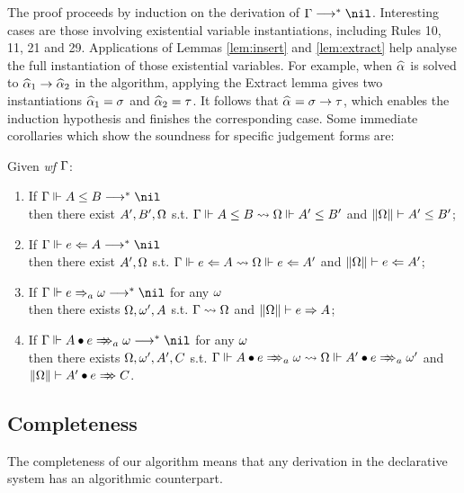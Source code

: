 The proof proceeds by induction on the derivation of $\Gm\redto\nil$.
Interesting cases are those involving existential variable instantiations,
including Rules 10, 11, 21 and 29.
Applications of Lemmas \ref{lem:insert} and \ref{lem:extract}
help analyse the full instantiation of those existential variables.
For example, when $\al$ is solved to $\al[1] \to \al[2]$ in the algorithm,
applying the Extract lemma gives two instantiations $\al[1] = \sigma$ and $\al[2] = \tau$.
It follows that $\al = \sigma \to \tau$, which enables the induction hypothesis
and finishes the corresponding case. Some immediate corollaries which
show the soundness for specific judgement forms are: 


\begin{corollary}
Given \emph{wf }$\Gamma$:
\begin{enumerate}
    \item If $\Gm \Vdash A \le B \redto \nil$\\
        then there exist $A', B', \Omega$ s.t.
        $\Gamma \Vdash A \le B \rightsquigarrow \Omega \Vdash A' \le B'$ and $\|\Omega\| \vdash A' \le B'$;
    \item If $\Gm \Vdash e \Lto A \redto \nil$\\
        then there exist $ A', \Omega$ s.t.
        $\Gamma \Vdash e \Leftarrow A \rightsquigarrow \Omega \Vdash e \Leftarrow A'$ and $\|\Omega\| \vdash e \Leftarrow A'$;
    \item If $\Gm \Vdash e \To_a \jg \redto \nil$ for any $\omega$\\
        then there exists $\Omega, \omega', A$ s.t.
        $\Gamma \rightsquigarrow \Omega$ and $\|\Omega\| \vdash e \Rightarrow A$;
    \item If $\Gm \Vdash \appInfAlg{A}{e} \redto \nil$ for any $\omega$\\
        then there exists $\Omega, \omega', A', C$ s.t.
        $\Gm \Vdash \appInfAlg{A}{e} \sto \Om \Vdash \appInfAlg{A'}{e}[a][\jg']$
            and $\|\Om\| \vdash \appInf{A'}{e}{C}$.
\end{enumerate}
\end{corollary}

\subsection{Completeness}

The completeness of our algorithm means that any derivation in the
declarative system has an algorithmic counterpart.

